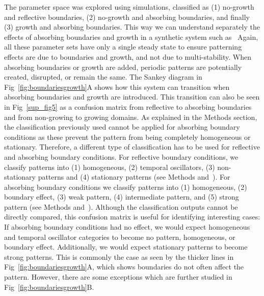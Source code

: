 \documentclass[10pt,letterpaper]{article}
\begin{document}
The parameter space was explored using simulations, classified as  (1) no-growth and reflective boundaries, (2) no-growth and absorbing boundaries, and finally (3) growth and absorbing boundaries. This way we can understand separately the effects of absorbing boundaries and growth in a synthetic system such as~\cite{Oliver2023}
Again, all these parameter sets have only a single steady state to ensure patterning effects are due to boundaries and growth, and not due to multi-stability.
When absorbing boundaries or growth are added, periodic patterns are potentially created, disrupted, or remain the same.
The Sankey diagram in Fig~\ref{fig:boundariesgrowth}A shows how this system can transition when absorbing boundaries and growth are introduced.
This transition can also be seen in Fig~\ref{sup_fig5} as a confusion matrix from reflective to absorbing boundaries and from non-growing to growing domains.
As explained in the Methods section, the classification previously used cannot be applied for absorbing boundary conditions as these prevent the pattern from being completely homogeneous or stationary.  %
Therefore, a different type of classification has to be used for reflective and absorbing boundary conditions.
For reflective boundary conditions, we classify patterns into (1) homogeneous, (2) temporal oscillators, (3) non-stationary patterns and (4) stationary patterns (see Methods and~). For absorbing boundary conditions we classify patterns into (1) homogeneous, (2) boundary effect, (3) weak pattern, (4) intermediate pattern, and (5) strong pattern (see Methods and~).
Although the classification outputs cannot be directly compared, this confusion matrix is useful for identifying interesting cases:
If absorbing boundary conditions had no effect, we would expect homogeneous and temporal oscillator categories to become no pattern, homogeneous, or boundary effect.
Additionally, we would expect stationary patterns to become strong patterns.
This is commonly the case as seen by the thicker lines in Fig~\ref{fig:boundariesgrowth}A, which shows boundaries do not often affect the pattern.
However, there are some exceptions which are further studied in Fig~\ref{fig:boundariesgrowth}B.
\end{document}
